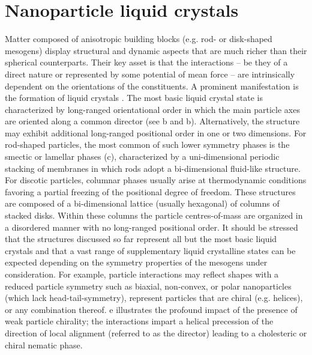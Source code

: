 \documentclass[amssymb]{revtex4}
\begin{document}
\newcommand{\bs}{ {\bf s} }


\section{Nanoparticle liquid crystals}

Matter composed of anisotropic building blocks (e.g. rod- or disk-shaped mesogens) display structural and dynamic aspects that are much richer than their spherical counterparts. Their key asset is that the interactions -- be they of a direct nature or represented by some potential of mean force -- are intrinsically dependent on the orientations of the constituents. A prominent manifestation is the formation of liquid crystals \cite{gennes-prost}. The most basic liquid crystal state is characterized by long-ranged orientational order in which the main particle axes are oriented along a common director (see b and b). Alternatively, the structure may exhibit additional long-ranged positional order in one or two dimensions. For rod-shaped particles, the most common of such lower symmetry phases is the smectic or lamellar phases (c), characterized by a uni-dimensional periodic stacking of membranes in which rods adopt a bi-dimensional fluid-like structure. For discotic particles,   columnar phases usually arise at thermodynamic conditions favoring a partial freezing of the positional degree of freedom. These structures are composed of a bi-dimensional lattice (usually hexagonal) of  columns of stacked disks. Within these columns the particle centres-of-mass are organized in a disordered manner with no long-ranged positional order. It should be stressed that the structures discussed so far represent all but the most basic liquid crystals and that a vast range of supplementary liquid crystalline states can be expected depending on the symmetry properties of the mesogens under consideration. For example,  particle interactions may
reflect shapes with a reduced particle symmetry such as  biaxial, non-convex, or  polar nanoparticles (which lack head-tail-symmetry), represent particles that are chiral (e.g. helices), or any combination thereof. e illustrates the profound impact of the presence of weak particle chirality; the interactions impart a helical precession of the direction of local alignment (referred to as the director) leading to a cholesteric or chiral nematic phase.   
\end{document}
